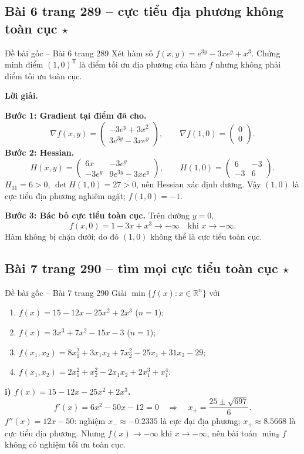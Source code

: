 \documentclass[11pt,a4paper]{article}
\newcommand{\R}{\mathbb{R}}
\newcommand{\grad}{\nabla}
\newcommand{\T}{^{\mathsf T}}
\begin{document}
\clearpage
\subsection{Bài 6 trang 289 -- cực tiểu địa phương không toàn cục \(\star\)}
\begin{questionbox}{Đề bài gốc -- Bài 6 trang 289}
Xét hàm số \(f(x,y)=e^{3y}-3xe^y+x^3\). Chứng minh điểm \((1,0)\T\) là điểm tối ưu địa phương của hàm \(f\) nhưng không phải điểm tối ưu toàn cục.
\end{questionbox}
\textbf{Lời giải.}

\textbf{Bước 1: Gradient tại điểm đã cho.}
\[
\grad f(x,y)=
\begin{pmatrix}-3e^y+3x^2\\3e^{3y}-3xe^y\end{pmatrix},
\qquad \grad f(1,0)=\begin{pmatrix}0\\0\end{pmatrix}.
\]
\textbf{Bước 2: Hessian.}
\[
H(x,y)=
\begin{pmatrix}6x&-3e^y\\-3e^y&9e^{3y}-3xe^y\end{pmatrix},
\qquad
H(1,0)=\begin{pmatrix}6&-3\\-3&6\end{pmatrix}.
\]
\(H_{11}=6>0\), \(\det H(1,0)=27>0\), nên Hessian xác định dương. Vậy \((1,0)\) là cực tiểu địa phương nghiêm ngặt; \(f(1,0)=-1\).

\textbf{Bước 3: Bác bỏ cực tiểu toàn cục.} Trên đường \(y=0\),
\[
f(x,0)=1-3x+x^3\longrightarrow-\infty\quad\text{khi }x\to-\infty.
\]
Hàm không bị chặn dưới; do đó \((1,0)\) không thể là cực tiểu toàn cục.

\clearpage
\subsection{Bài 7 trang 290 -- tìm mọi cực tiểu toàn cục \(\star\)}
\begin{questionbox}{Đề bài gốc -- Bài 7 trang 290}
Giải \(\min\{f(x):x\in\R^n\}\) với
\begin{enumerate}[label=\roman*),nosep,leftmargin=*]
\item \(f(x)=15-12x-25x^2+2x^3\) (\(n=1\));
\item \(f(x)=3x^3+7x^2-15x-3\) (\(n=1\));
\item \(f(x_1,x_2)=8x_1^2+3x_1x_2+7x_2^2-25x_1+31x_2-29\);
\item \(f(x_1,x_2)=2x_1^2+x_2^2-2x_1x_2+2x_1^3+x_1^4\).
\end{enumerate}
\end{questionbox}
\textbf{i) \(f(x)=15-12x-25x^2+2x^3\).}
\[
f'(x)=6x^2-50x-12=0
\quad\Longrightarrow\quad x_{\pm}=\frac{25\pm\sqrt{697}}6.
\]
\(f''(x)=12x-50\): nghiệm \(x_-\approx-0.2335\) là cực đại địa phương; \(x_+\approx8.5668\) là cực tiểu địa phương. Nhưng \(f(x)\to-\infty\) khi \(x\to-\infty\), nên bài toán \(\min_{\R} f\) không có nghiệm tối ưu toàn cục.
\end{document}
